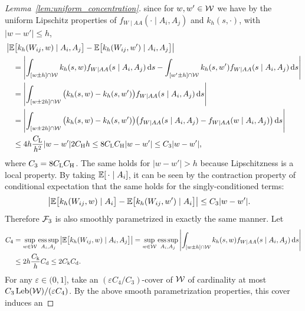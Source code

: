 \begin{proof}[Lemma~\ref{lem:uniform_concentration}]
  since for $w,w' \in \mathcal{W}$ we have
  by the uniform Lipschitz properties of
  $f_{W \mid AA}(\cdot \mid A_i, A_j)$ and
  $k_h(s, \cdot)$,
  with $|w-w'| \leq h$,
  \begin{align*}
    &\left|
    \mathbb{E}\big[ k_h(W_{ij},w) \mid A_i, A_j \big]
    - \mathbb{E}\big[ k_h(W_{ij},w') \mid A_i, A_j \big]
    \right| \\
    &\quad=
    \left|
    \int_{[w \pm h] \cap \mathcal{W}}
    k_h(s,w)
    f_{W \mid AA}(s \mid A_i, A_j)
    \,\mathrm{d}s
    - \int_{[w' \pm h] \cap \mathcal{W}}
    k_h(s,w')
    f_{W \mid AA}(s \mid A_i, A_j)
    \,\mathrm{d}s
    \right| \\
    &\quad=
    \left|
    \int_{[w \pm 2h] \cap \mathcal{W}}
    \big(
    k_h(s,w)
    - k_h(s,w')
    \big)
    f_{W \mid AA}(s \mid A_i, A_j)
    \,\mathrm{d}s
    \right| \\
    &\quad=
    \left|
    \int_{[w \pm 2h] \cap \mathcal{W}}
    \big(
    k_h(s,w)
    - k_h(s,w')
    \big)
    \big(
    f_{W \mid AA}(s \mid A_i, A_j)
    - f_{W \mid AA}(w \mid A_i, A_j)
    \big)
    \,\mathrm{d}s
    \right| \\
    &\quad\leq
    4h
    \frac{C_\mathrm{L}}{h^2}
    |w-w'|
    2 C_\mathrm{H} h
    \leq
    8 C_\mathrm{L} C_\mathrm{H}
    |w-w'|
    \leq
    C_3
    |w-w'|,
  \end{align*}
  where $C_3 = 8 C_\mathrm{L} C_\mathrm{H}$.
  The same holds for $|w-w'| > h$
  because Lipschitzness is a local property.
  By taking $\mathbb{E}[\, \cdot \mid A_i]$,
  it can be seen
  by the contraction property of conditional expectation that
  the same holds for the
  singly-conditioned terms:
  \begin{align*}
    \left|
    \mathbb{E}\big[ k_h(W_{ij},w) \mid A_i \big]
    - \mathbb{E}\big[ k_h(W_{ij},w') \mid A_i \big]
    \right|
    &\leq
    C_3
    |w-w'|.
  \end{align*}
  Therefore $\mathcal{F}_3$ is also smoothly parametrized
  in exactly the same manner.
  Let
  \begin{align*}
    C_4
    &=
    \sup_{w \in \mathcal{W}}
    \operatorname*{ess\,sup}_{A_i, A_j}
    \big|
    \mathbb{E}\big[ k_h(W_{ij},w) \mid A_i, A_j \big]
    \big|
    =
    \sup_{w \in \mathcal{W}}
    \operatorname*{ess\,sup}_{A_i, A_j}
    \left|
    \int_{[w \pm h] \cap \mathcal{W}}
    k_h(s,w)
    f_{W \mid AA}(s \mid A_i, A_j)
    \,\mathrm{d}s
    \right| \\
    &\leq 2h \frac{C_\mathrm{k}}{h} C_\mathrm{d}
    \leq 2 C_\mathrm{k} C_\mathrm{d}.
  \end{align*}
  For any $\varepsilon \in (0,1]$,
  take an $(\varepsilon C_4/C_3)$-cover of $\mathcal{W}$
  of cardinality at most $C_3 \operatorname{Leb}(\mathcal{W}) / (\varepsilon C_4)$.
  By the above smooth parametrization properties,
  this cover induces an

\end{proof}
